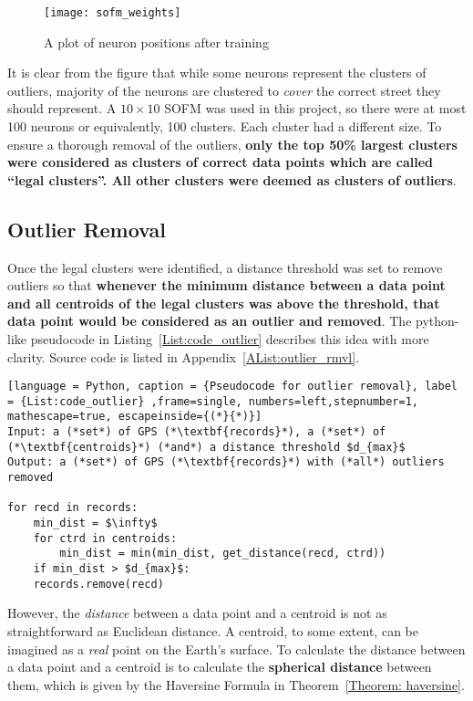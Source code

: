 \begin{figure}[h]
\texttt{[image: sofm\_weights]}
\centering
\caption{A plot of neuron positions after training}\label{Fig:sofm_weights}
\end{figure}

It is clear from the figure that while some neurons represent the clusters of outliers, majority of the neurons are clustered to \emph{cover} the correct street they should represent. A $10\times10$ SOFM was used in this project, so there were at most 100 neurons or equivalently, 100 clusters. Each cluster had a different size. To ensure a thorough removal of the outliers, \textbf{only the top 50\% largest clusters were considered as clusters of correct data points which are called ``legal clusters''. All other clusters were deemed as clusters of outliers}. 

\subsection{Outlier Removal}\label{Subsec:outlier_removal}
Once the legal clusters were identified, a distance threshold was set to remove outliers so that \textbf{whenever the minimum distance between a data point and all centroids of the legal clusters was above the threshold, that data point would be considered as an outlier and removed}. The python-like pseudocode in Listing~\ref{List:code_outlier} describes this idea with more clarity. Source code is listed in Appendix~\ref{AList:outlier_rmvl}.

\begin{lstlisting}[language = Python, caption = {Pseudocode for outlier removal}, label = {List:code_outlier} ,frame=single, numbers=left,stepnumber=1, mathescape=true, escapeinside={(*}{*)}]
Input: a (*set*) of GPS (*\textbf{records}*), a (*set*) of (*\textbf{centroids}*) (*and*) a distance threshold $d_{max}$
Output: a (*set*) of GPS (*\textbf{records}*) with (*all*) outliers removed

for recd in records:
    min_dist = $\infty$
    for ctrd in centroids:
        min_dist = min(min_dist, get_distance(recd, ctrd))
    if min_dist > $d_{max}$:
	records.remove(recd)
\end{lstlisting}

However, the \emph{distance} between a data point and a centroid is not as straightforward as Euclidean distance. A centroid, to some extent, can be imagined as a \emph{real} point on the Earth's surface. To calculate the distance between a data point and a centroid is to calculate the \textbf{spherical distance} between them, which is given by the Haversine Formula in Theorem~\ref{Theorem: haversine}. 


